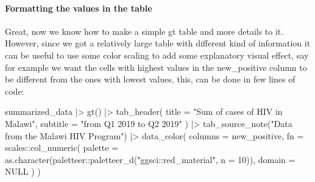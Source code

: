 \documentclass[
]{article}
\newenvironment{Shaded}{\begin{snugshade}}{\end{snugshade}}
\newcommand{\AttributeTok}[1]{\textcolor[rgb]{0.77,0.63,0.00}{#1}}
\newcommand{\ConstantTok}[1]{\textcolor[rgb]{0.00,0.00,0.00}{#1}}
\newcommand{\DecValTok}[1]{\textcolor[rgb]{0.00,0.00,0.81}{#1}}
\newcommand{\FunctionTok}[1]{\textcolor[rgb]{0.00,0.00,0.00}{#1}}
\newcommand{\NormalTok}[1]{#1}
\newcommand{\SpecialCharTok}[1]{\textcolor[rgb]{0.00,0.00,0.00}{#1}}
\newcommand{\StringTok}[1]{\textcolor[rgb]{0.31,0.60,0.02}{#1}}
\begin{document}
\hypertarget{formatting-the-values-in-the-table}{%
\paragraph{Formatting the values in the
table}\label{formatting-the-values-in-the-table}}

Great, now we know how to make a simple gt table and more details to it.
However, since we got a relatively large table with different kind of
information it can be useful to use some color scaling to add some
explanatory visual effect, say for example we want the cells with
highest values in the new\_positive column to be different from the ones
with lowest values, this, can be done in few lines of code:

\begin{Shaded}
\begin{Highlighting}[]
\NormalTok{summarized\_data }\SpecialCharTok{|\textgreater{}} 
  \FunctionTok{gt}\NormalTok{() }\SpecialCharTok{|\textgreater{}} 
  \FunctionTok{tab\_header}\NormalTok{(}
    \AttributeTok{title =} \StringTok{"Sum of cases of HIV in Malawi"}\NormalTok{,}
    \AttributeTok{subtitle =} \StringTok{"from Q1 2019 to Q2 2019"}
\NormalTok{  ) }\SpecialCharTok{|\textgreater{}} 
  \FunctionTok{tab\_source\_note}\NormalTok{(}\StringTok{"Data from the Malawi HIV Program"}\NormalTok{) }\SpecialCharTok{|\textgreater{}} 
  \FunctionTok{data\_color}\NormalTok{(}
    \AttributeTok{columns =}\NormalTok{ new\_positive,}
    \AttributeTok{fn =}\NormalTok{ scales}\SpecialCharTok{::}\FunctionTok{col\_numeric}\NormalTok{(}
      \AttributeTok{palette =} \FunctionTok{as.character}\NormalTok{(paletteer}\SpecialCharTok{::}\FunctionTok{paletteer\_d}\NormalTok{(}\StringTok{"ggsci::red\_material"}\NormalTok{, }\AttributeTok{n =} \DecValTok{10}\NormalTok{)),}
      \AttributeTok{domain =} \ConstantTok{NULL}
\NormalTok{    )}
\NormalTok{  )}
\end{Highlighting}
\end{Shaded}
\end{document}
